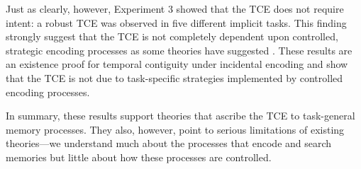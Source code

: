 \documentclass[man,natbib,floatsintext]{apa6} %
\begin{document}
Just as clearly, however, Experiment 3 showed that the TCE does not require intent: a robust TCE was observed in five different implicit tasks. This finding strongly suggest that the TCE is not completely dependent upon controlled, strategic encoding processes as some theories have suggested \citep{Hint16}. These results are an existence proof for temporal contiguity under incidental encoding and show that the TCE is not due to task-specific strategies implemented by controlled encoding processes.

In summary, these results support theories that ascribe the TCE to task-general memory processes. They also, however, point to serious limitations of existing theories---we understand much about the processes that encode and search memories but little about how these processes are controlled.

%
%
%
%
%
%
%
\end{document}
